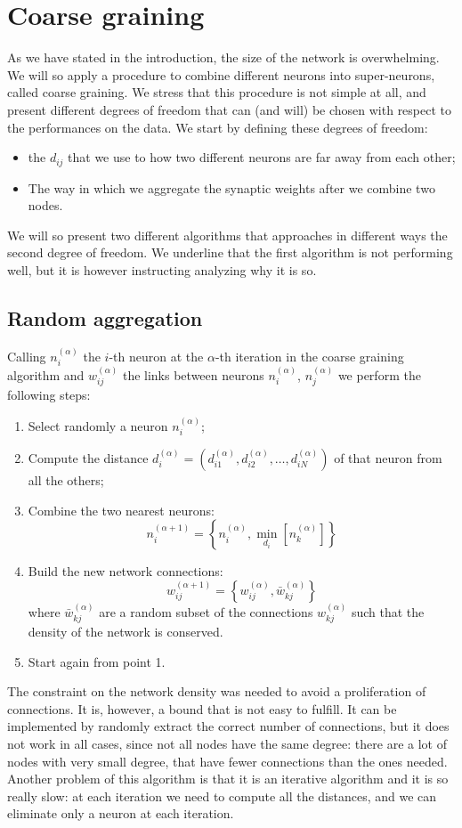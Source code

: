 \section{Coarse graining \label{sec:coarse}}
As we have stated in the introduction, the size of the network is overwhelming.
We will so apply a procedure to combine different neurons into super-neurons, 
called coarse graining. We stress that this procedure
is not simple at all, and present different degrees of freedom
that can (and will) be chosen with respect to the performances
on the data. We start by defining these degrees of freedom:
\begin{itemize}
    \item the  $d_{ij}$ that we use to how two 
        different neurons are far away from each other;
    \item The way in which we aggregate the synaptic weights after we combine 
        two nodes.
\end{itemize}
We will so present two different algorithms that approaches in different ways the second 
degree of freedom. We underline that the first algorithm is not performing well, but it is 
however instructing analyzing why it is so.

\subsection{Random aggregation}
Calling $n_i^{(\alpha)}$ the $i$-th 
neuron at the $\alpha$-th iteration in the coarse graining algorithm and $w_{ij}^{(\alpha)}$
the links between neurons $n_i^{(\alpha)}$, $n_j^{(\alpha)}$ we perform the following
steps:
\begin{enumerate}
    \item Select randomly a neuron $n_i^{(\alpha)}$;
    \item Compute the distance $d_i^{(\alpha)}=(d_{i1}^{(\alpha)}, d_{i2}^{(\alpha)}, \dots, d_{iN}^{(\alpha)})$
        of that neuron from all the others;
    \item Combine the two nearest neurons:
        $$
        n_i^{(\alpha+1)} = \left\{ n_i^{(\alpha)}, \min_{d_i}\left[n_k^{(\alpha)}\right] \right\}
        $$
    \item Build the new network connections:
        $$
        w_{ij}^{(\alpha+1)} = \left\{ w_{ij}^{(\alpha)}, \bar{w}_{kj}^{(\alpha)}   \right\}
        $$
        where $\bar{w}_{kj}^{(\alpha)}$ are a random subset of the connections $w^{(\alpha)}_{kj}$ such that 
        the density of the network is conserved.
    \item Start again from point 1.
\end{enumerate} 
The constraint on the network density was needed to avoid a proliferation of connections.
It is, however, a bound that is not easy to fulfill. It can be implemented 
by randomly extract the correct number of connections, but it does not work in all cases, since
not all nodes have the same degree: there are a lot of nodes with very small degree, that have 
fewer connections than the ones needed. Another problem of this algorithm is that it is an
iterative algorithm and it is so really slow: at each iteration we need to compute all the 
distances, and we can eliminate only a neuron at each iteration.

